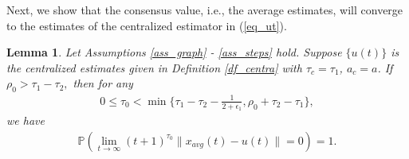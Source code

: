 \documentclass[10pt,journal,final]{IEEEtran}
\theoremstyle{plain}
\newtheorem{lemma}{\textbf{Lemma}}[section]
\theoremstyle{definition}
\theoremstyle{remark}
\begin{document}
Next, we show that the consensus value, i.e., the average estimates, will converge to the estimates of the centralized estimator in (\ref{eq_ut}).
\begin{lemma}\label{lem_appro_centr}
	Let Assumptions \ref{ass_graph} - \ref{ass_steps} hold. 
	Suppose $\{u(t)\}$ is the centralized estimates given in Definition \ref{df_centra} with $\tau_c=\tau_1$, $a_c=a$.
	If $\rho_0>\tau_1-\tau_2,$
	then for any
		\begin{align*}
	0\leq\tau_0<\min\{\tau_1-\tau_2-\frac{1}{2+\epsilon_1},\rho_0+\tau_2-\tau_1\}, 
	\end{align*}
	we have	
\begin{align*}
	\mathbb{P}\left(\lim\limits_{t\rightarrow\infty}(t+1)^{\tau_0}\|x_{avg}(t)-u(t)\|=0\right)=1.
\end{align*}
\end{lemma}
\end{document}
